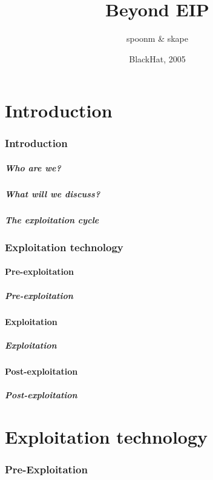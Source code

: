 \documentclass{beamer}
\title{Beyond EIP}
\author[spoonm \& skape] {spoonm \& skape}
\date[BlackHat 2005] {BlackHat, 2005}
\begin{document}
\begin{frame}[t]
  \titlepage
\end{frame}

\part{Introduction}

\section{Introduction}
\begin{frame}[t]
    \frametitle{Who are we?}
\end{frame}
\begin{frame}[t]
    \frametitle{What will we discuss?}
\end{frame}
\begin{frame}[t]
    \frametitle{The exploitation cycle}
\end{frame}

\section{Exploitation technology}
    \subsection{Pre-exploitation}
\begin{frame}[t]
    \frametitle{Pre-exploitation}
\end{frame}
    \subsection{Exploitation}
\begin{frame}[t]
    \frametitle{Exploitation}
\end{frame}
    \subsection{Post-exploitation}
\begin{frame}[t]
    \frametitle{Post-exploitation}
\end{frame}

\part{Exploitation technology}

\section{Pre-Exploitation}
\end{document}
